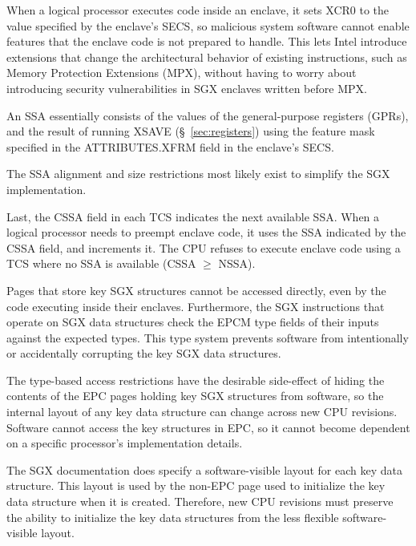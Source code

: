 When a logical processor executes code inside an enclave, it sets XCR0 to the
value specified by the enclave's SECS, so malicious system software cannot
enable features that the enclave code is not prepared to handle. This lets
Intel introduce extensions that change the architectural behavior of existing
instructions, such as Memory Protection Extensions (MPX), without having to
worry about introducing security vulnerabilities in SGX enclaves written before
MPX.

An SSA essentially consists of the values of the general-purpose registers
(GPRs), and the result of running XSAVE (\S~\ref{sec:registers}) using the
feature mask specified in the ATTRIBUTES.XFRM field in the enclave's SECS.

The SSA alignment and size restrictions most likely exist to simplify the
SGX implementation.


Last, the CSSA field in each TCS indicates the next available SSA. When a
logical processor needs to preempt enclave code, it uses the SSA indicated by
the CSSA field, and increments it. The CPU refuses to execute enclave code
using a TCS where no SSA is available (CSSA $\ge$ NSSA).







Pages that store key SGX structures cannot be accessed directly, even by the
code executing inside their enclaves. Furthermore, the SGX instructions that
operate on SGX data structures check the EPCM type fields of their inputs
against the expected types. This type system prevents software from
intentionally or accidentally corrupting the key SGX data structures.

The type-based access restrictions have the desirable side-effect of hiding the
contents of the EPC pages holding key SGX structures from software, so the
internal layout of any key data structure can change across new CPU revisions.
Software cannot access the key structures in EPC, so it cannot become dependent
on a specific processor's implementation details.

The SGX documentation does specify a software-visible layout for each key data
structure. This layout is used by the non-EPC page used to initialize the key
data structure when it is created. Therefore, new CPU revisions must preserve
the ability to initialize the key data structures from the less flexible
software-visible layout.

